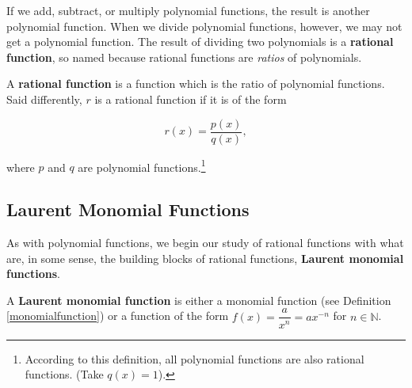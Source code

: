 
\setcounter{footnote}{0}

\label{IntroRational}

If we add, subtract, or multiply polynomial functions, the result is another polynomial function.  When we divide polynomial functions, however, we may not get a polynomial function.   The result of dividing two polynomials is a    \textbf{rational function}, so named because rational functions  are \textit{ratios} of polynomials.

\smallskip

\begin{tcolorbox}

\begin{defn}  \label{rationalfunction} A \textbf{rational function} is a function which is the ratio of polynomial functions.  Said differently, $r$ is a rational function if it is of the form 

\[ r(x) = \dfrac{p(x)}{q(x)},\]

where $p$ and $q$ are polynomial functions.\footnote{According to this definition, all polynomial functions are also  rational functions. (Take $q(x) = 1$).}

\end{defn}

\end{tcolorbox}

\subsection{Laurent Monomial Functions}
\label{LaurentMonomialFunctionsSection}

As with polynomial functions, we begin our study of rational functions with what are, in some sense, the building blocks of rational functions, \textbf{Laurent monomial functions}.  

\begin{tcolorbox}

\begin{defn}  \label{laurentmonomialfunction} A \textbf{Laurent monomial function} is either a monomial function (see Definition \ref{monomialfunction}) or a function of the form $f(x) = \dfrac{a}{x^n} = ax^{-n}$ for $n \in \mathbb{N}$.

\end{defn}

\end{tcolorbox}


